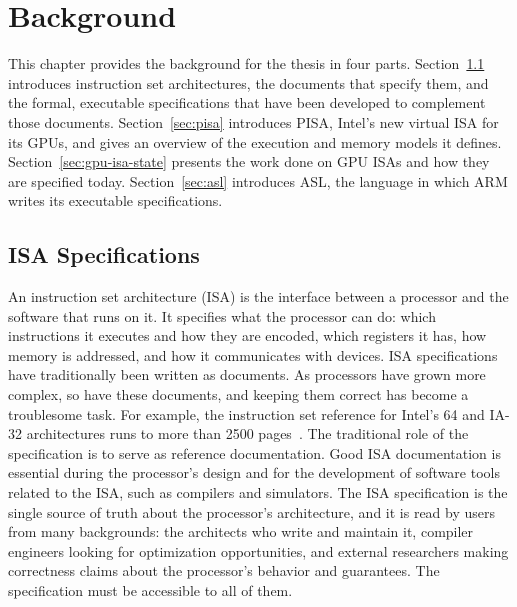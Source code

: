 
\chapter{Background}
\label{chap:background}

This chapter provides the background for the thesis in four parts.
Section~\ref{sec:isa-specs} introduces instruction set architectures, the
documents that specify them, and the formal, executable specifications that
have been developed to complement those documents. Section~\ref{sec:pisa} introduces
PISA, Intel's new virtual ISA for its GPUs, and gives an overview of the
execution and memory models it defines. Section~\ref{sec:gpu-isa-state} presents the work done on GPU ISAs
and how they are specified today. Section~\ref{sec:asl}
introduces ASL, the language in which ARM writes its executable specifications.

\section{ISA Specifications}
\label{sec:isa-specs}

An instruction set architecture (ISA) is the interface between a
processor and the software that runs on it. It specifies what the
processor can do: which instructions it executes and how they are
encoded, which registers it has, how memory is addressed, and how it
communicates with devices. ISA specifications have traditionally been
written as documents. As processors have grown more complex, so have
these documents, and keeping them correct has become a troublesome task. For example, the instruction set reference for Intel's 64 and IA-32
architectures runs to more than 2500 pages~\cite{intel-isa}. The traditional role of the 
specification is to serve as reference documentation. 
Good ISA documentation is essential during the processor's design and
for the development of software tools related to the ISA, such as compilers and simulators. The ISA specification is the single source of truth about the processor's
architecture, and it is read by users from many backgrounds: the architects
who write and maintain it, compiler engineers looking for optimization
opportunities, and external researchers making correctness claims about the
processor's behavior and guarantees. The specification must be accessible to
all of them.

